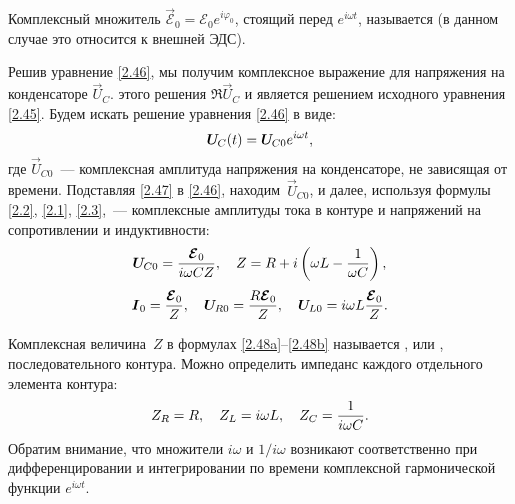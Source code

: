 Комплексный множитель $\vec{\mathcal{E}}_0=\mathcal{E}_0e^{i\varphi_0}$, стоящий
перед $e^{i\omega t}$, называется  (в данном
случае это относится к внешней ЭДС). 

Решив уравнение \eqref{2.46}, мы получим
комплексное выражение для напряжения на конденсаторе $\vec{U}_{\! C}$. 
 этого решения
$\Re \vec{U}_{\! C}$ и является решением исходного уравнения \eqref{2.45}.
Будем искать решение уравнения \eqref{2.46} в виде:
\begin{equation}\eqmark{2.47}
\vec{U}_{\! C}(t)=\vec{U}_{\! C0}e^{i\omega t},
\end{equation}
где $\vec{U}_{\! C0}$~--- комплексная амплитуда напряжения на конденсаторе, не
зависящая от времени. Подставляя \eqref{2.47} в \eqref{2.46},
находим~$\vec{U}_{\! C0}$, и далее, используя формулы \eqref{2.2}, \eqref{2.1},
\eqref{2.3},~--- комплексные амплитуды тока в контуре и напряжений на
сопротивлении и индуктивности:
		\begin{equation}
			\eqmark{2.48a}
	\vec{U}_{\! C0}=\frac{\vec{\mathcal{E}}_0}{i\omega CZ}, 
    \quad Z=R+i\left(\omega L-\frac{1}{\omega C}\right),
		\end{equation}
		\begin{equation}
			\eqmark{2.48b}
			\vec I_0=\frac{\vec{\mathcal{E}}_0}{Z}, \quad
			\vec{U}_{\! R0}=\frac{R\vec{\mathcal{E}}_0}{Z}, \quad
			\vec{U}_{\! L0}=i\omega L\frac{\vec{\mathcal{E}}_0}{Z}.
		\end{equation}

Комплексная величина~$Z$ в формулах \eqref{2.48a}--\eqref{2.48b} называется
, или ,
последовательного контура.
Можно определить импеданс каждого отдельного элемента контура:
\begin{equation}
	\eqmark{2.49}
			Z_R=R, \quad Z_L=i\omega L, \quad Z_C=\frac{1}{i\omega C}.
\end{equation}
Обратим внимание, что множители $i\omega$ и $1/i\omega$
возникают соответственно при дифференцировании и интегрировании по времени 
комплексной гармонической функции $e^{i\omega t}$.

